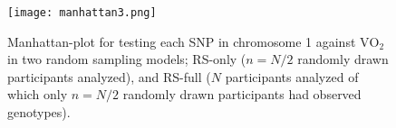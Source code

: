 \documentclass[10pt,a4paper]{article}
\begin{document}
\begin{figure}
	\centering
	\texttt{[image: manhattan3.png]}
	\caption{Manhattan-plot for testing each SNP in chromosome 1 against $\text{VO}_2$ in two random sampling models; RS-only ($n = N/2$ randomly drawn participants analyzed), and RS-full ($N$ participants analyzed of which only $n=N/2$ randomly drawn participants had observed genotypes).}
	\label{fig:manhattanRS}
\end{figure}



\end{document}

